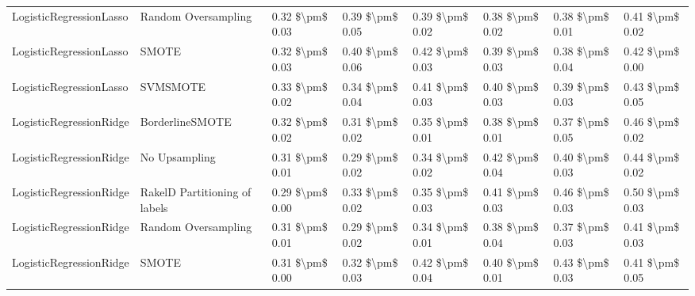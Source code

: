 \begin{tabular}{llllllll}
        LogisticRegressionLasso &           Random Oversampling & 0.32 \$\textbackslash pm\$ 0.03 &           0.39 \$\textbackslash pm\$ 0.05 &       0.39 \$\textbackslash pm\$ 0.02 &        0.38 \$\textbackslash pm\$ 0.02 &                         0.38 \$\textbackslash pm\$ 0.01 &     0.41 \$\textbackslash pm\$ 0.02 \\
        LogisticRegressionLasso &                         SMOTE & 0.32 \$\textbackslash pm\$ 0.03 &           0.40 \$\textbackslash pm\$ 0.06 &       0.42 \$\textbackslash pm\$ 0.03 &        0.39 \$\textbackslash pm\$ 0.03 &                         0.38 \$\textbackslash pm\$ 0.04 &     0.42 \$\textbackslash pm\$ 0.00 \\
        LogisticRegressionLasso &                      SVMSMOTE & 0.33 \$\textbackslash pm\$ 0.02 &           0.34 \$\textbackslash pm\$ 0.04 &       0.41 \$\textbackslash pm\$ 0.03 &        0.40 \$\textbackslash pm\$ 0.03 &                         0.39 \$\textbackslash pm\$ 0.03 &     0.43 \$\textbackslash pm\$ 0.05 \\
        LogisticRegressionRidge &               BorderlineSMOTE & 0.32 \$\textbackslash pm\$ 0.02 &           0.31 \$\textbackslash pm\$ 0.02 &       0.35 \$\textbackslash pm\$ 0.01 &        0.38 \$\textbackslash pm\$ 0.01 &                         0.37 \$\textbackslash pm\$ 0.05 &     0.46 \$\textbackslash pm\$ 0.02 \\
        LogisticRegressionRidge &                 No Upsampling & 0.31 \$\textbackslash pm\$ 0.01 &           0.29 \$\textbackslash pm\$ 0.02 &       0.34 \$\textbackslash pm\$ 0.02 &        0.42 \$\textbackslash pm\$ 0.04 &                         0.40 \$\textbackslash pm\$ 0.03 &     0.44 \$\textbackslash pm\$ 0.02 \\
        LogisticRegressionRidge & RakelD Partitioning of labels & 0.29 \$\textbackslash pm\$ 0.00 &           0.33 \$\textbackslash pm\$ 0.02 &       0.35 \$\textbackslash pm\$ 0.03 &        0.41 \$\textbackslash pm\$ 0.03 &                         0.46 \$\textbackslash pm\$ 0.03 &     0.50 \$\textbackslash pm\$ 0.03 \\
        LogisticRegressionRidge &           Random Oversampling & 0.31 \$\textbackslash pm\$ 0.01 &           0.29 \$\textbackslash pm\$ 0.02 &       0.34 \$\textbackslash pm\$ 0.01 &        0.38 \$\textbackslash pm\$ 0.04 &                         0.37 \$\textbackslash pm\$ 0.03 &     0.41 \$\textbackslash pm\$ 0.03 \\
        LogisticRegressionRidge &                         SMOTE & 0.31 \$\textbackslash pm\$ 0.00 &           0.32 \$\textbackslash pm\$ 0.03 &       0.42 \$\textbackslash pm\$ 0.04 &        0.40 \$\textbackslash pm\$ 0.01 &                         0.43 \$\textbackslash pm\$ 0.03 &     0.41 \$\textbackslash pm\$ 0.05 \\

\end{tabular}
